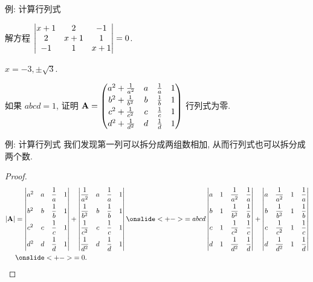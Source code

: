 \begin{frame}{例: 计算行列式}
	\onslide<+->
	\begin{exercise}
		解方程 $\left|\begin{matrix}
			x+1&2&-1\\
			2&x+1&1\\
			-1&1&x+1\end{matrix}\right|=0$.
	\end{exercise}
	\onslide<+->
	\begin{answer}
		$x=-3,\pm\sqrt3$.
	\end{answer}
	\onslide<+->
	\begin{example}
		如果 $abcd=1$, 证明 ${\mathbf{A}}=\begin{pmatrix}
			a^2+\frac1{a^2}&a&\frac1a&1\\[2pt]
			b^2+\frac1{b^2}&b&\frac1b&1\\[2pt]
			c^2+\frac1{c^2}&c&\frac1c&1\\[2pt]
			d^2+\frac1{d^2}&d&\frac1d&1
		\end{pmatrix}$ 行列式为零.
	\end{example}
\end{frame}


\begin{frame}{例: 计算行列式}
	\onslide<+->
	我们发现第一列可以拆分成两组数相加, 从而行列式也可以拆分成两个数.
	\onslide<+->
	\begin{proof}
		\begin{align*}
			|\bfA|&=\detm{
				a^2&a&\dfrac1a&1\\[7pt]
				b^2&b&\dfrac1b&1\\[7pt]
				c^2&c&\dfrac1c&1\\[7pt]
				d^2&d&\dfrac1d&1}+\detm{
				\dfrac1{a^2}&a&\dfrac1a&1\\[7pt]
				\dfrac1{b^2}&b&\dfrac1b&1\\[7pt]
				\dfrac1{c^2}&c&\dfrac1c&1\\[7pt]
				\dfrac1{d^2}&d&\dfrac1d&1}
			\onslide<+->{=abcd\detm{
				a&1&\dfrac1{a^2}&\dfrac1a\\[7pt]
				b&1&\dfrac1{b^2}&\dfrac1b\\[7pt]
				c&1&\dfrac1{c^2}&\dfrac1c\\[7pt]
				d&1&\dfrac1{d^2}&\dfrac1d}+\detm{
				a&\dfrac1{a^2}&1&\dfrac1a\\[7pt]
				b&\dfrac1{b^2}&1&\dfrac1b\\[7pt]
				c&\dfrac1{c^2}&1&\dfrac1c\\[7pt]
				d&\dfrac1{d^2}&1&\dfrac1d}}\\
				&\onslide<+->{=0.}\qedhere
		\end{align*}
	\end{proof}
\end{frame}


